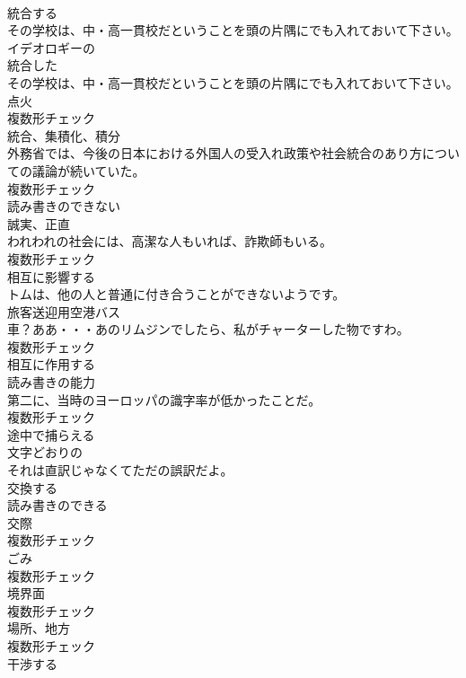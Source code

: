 \documentclass[8pt]{extreport}
\begin{document}
\begin{CJK}{UTF8}{min}
\\	[動詞]	統合する	
\\	その学校は、中・高一貫校だということを頭の片隅にでも入れておいて下さい。	
\\	[形容詞]	イデオロギーの	
\\	[形容詞]	統合した	
\\	その学校は、中・高一貫校だということを頭の片隅にでも入れておいて下さい。	
\\	[名詞]	点火	
\\	複数形チェック
\\	[名詞]	統合、集積化、積分	
\\	外務省では、今後の日本における外国人の受入れ政策や社会統合のあり方についての議論が続いていた。	
\\	複数形チェック
\\	[形容詞]	読み書きのできない	
\\	[名詞]	誠実、正直	
\\	われわれの社会には、高潔な人もいれば、詐欺師もいる。	
\\	複数形チェック
\\	[動詞]	相互に影響する	
\\	トムは、他の人と普通に付き合うことができないようです。	
\\	[名詞]	旅客送迎用空港バス	
\\	車？ああ・・・あのリムジンでしたら、私がチャーターした物ですわ。	
\\	複数形チェック
\\	[形容詞]	相互に作用する	
\\	[名詞]	読み書きの能力	
\\	第二に、当時のヨーロッパの識字率が低かったことだ。	
\\	複数形チェック
\\	[動詞]	途中で捕らえる	
\\	[形容詞]	文字どおりの	
\\	それは直訳じゃなくてただの誤訳だよ。	
\\	[動詞]	交換する	
\\	[形容詞]	読み書きのできる	
\\	[名詞]	交際	
\\	複数形チェック
\\	[名詞]	ごみ	
\\	複数形チェック
\\	[名詞]	境界面	
\\	複数形チェック
\\	[名詞]	場所、地方	
\\	複数形チェック
\\	[動詞]	干渉する	

\end{CJK}
\end{document}
